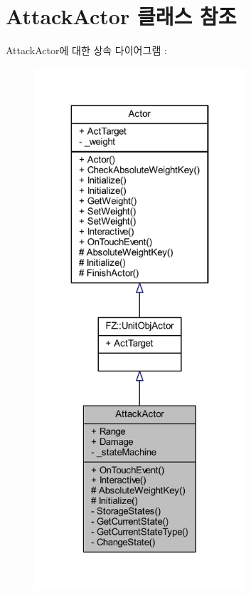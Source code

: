 \hypertarget{class_attack_actor}{}\section{Attack\+Actor 클래스 참조}
\label{class_attack_actor}


Attack\+Actor에 대한 상속 다이어그램 \+: 
\nopagebreak
\begin{figure}[H]
\begin{center}
\leavevmode
\includegraphics[height=550pt]{class_attack_actor__inherit__graph}
\end{center}
\end{figure}


